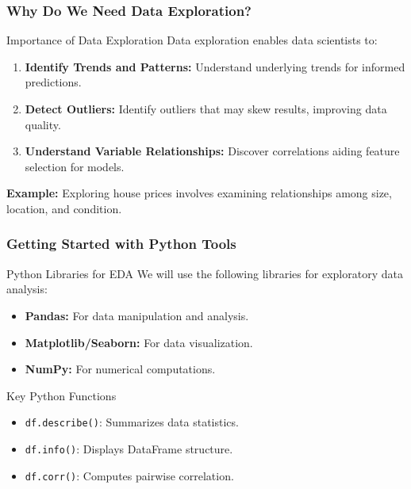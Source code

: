 \documentclass[aspectratio=169]{beamer}
\begin{document}
\begin{frame}
    \frametitle{Why Do We Need Data Exploration?}
    \begin{block}{Importance of Data Exploration}
        Data exploration enables data scientists to:
        \begin{enumerate}
            \item \textbf{Identify Trends and Patterns:} Understand underlying trends for informed predictions.
            \item \textbf{Detect Outliers:} Identify outliers that may skew results, improving data quality.
            \item \textbf{Understand Variable Relationships:} Discover correlations aiding feature selection for models.
        \end{enumerate}
        \textbf{Example:} Exploring house prices involves examining relationships among size, location, and condition.
    \end{block}
\end{frame}

\begin{frame}[fragile]
    \frametitle{Getting Started with Python Tools}
    \begin{block}{Python Libraries for EDA}
        We will use the following libraries for exploratory data analysis:
        \begin{itemize}
            \item \textbf{Pandas:} For data manipulation and analysis.
            \item \textbf{Matplotlib/Seaborn:} For data visualization.
            \item \textbf{NumPy:} For numerical computations.
        \end{itemize}
    \end{block}
    
    \begin{block}{Key Python Functions}
        \begin{itemize}
            \item \texttt{df.describe()}: Summarizes data statistics.
            \item \texttt{df.info()}: Displays DataFrame structure.
            \item \texttt{df.corr()}: Computes pairwise correlation.
        \end{itemize}
    \end{block}
\end{frame}
\end{document}
